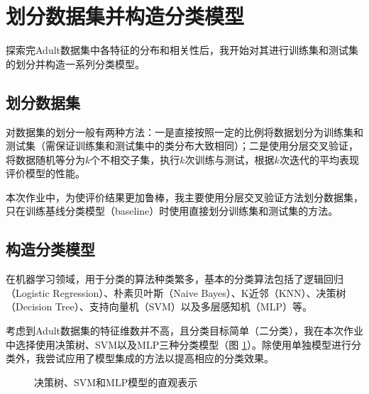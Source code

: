\documentclass[12pt,a4paper]{article}
\theoremstyle{definition}
\begin{document}
\section{划分数据集并构造分类模型}

探索完Adult数据集中各特征的分布和相关性后，我开始对其进行训练集和测试集的划分并构造一系列分类模型。

\subsection{划分数据集}

对数据集的划分一般有两种方法：一是直接按照一定的比例将数据划分为训练集和测试集（需保证训练集和测试集中的类分布大致相同）；二是使用分层交叉验证，将数据随机等分为$k$个不相交子集，执行$k$次训练与测试，根据$k$次迭代的平均表现评价模型的性能。

\vspace{0.01\linewidth}
本次作业中，为使评价结果更加鲁棒，我主要使用分层交叉验证方法划分数据集，只在训练基线分类模型（baseline）时使用直接划分训练集和测试集的方法。

\subsection{构造分类模型}

在机器学习领域，用于分类的算法种类繁多，基本的分类算法包括了逻辑回归（Logistic Regression）、朴素贝叶斯（Naive Bayes）、K近邻（KNN）、决策树（Decision Tree）、支持向量机（SVM）以及多层感知机（MLP）等。

\vspace{0.01\linewidth}
考虑到Adult数据集的特征维数并不高，且分类目标简单（二分类），我在本次作业中选择使用决策树、SVM以及MLP三种分类模型（图 \ref{fig:model-init}）。除使用单独模型进行分类外，我尝试应用了模型集成的方法以提高相应的分类效果。

\begin{figure}[H]
	\centering
	\caption{决策树、SVM和MLP模型的直观表示}
	\label{fig:model-init}
\end{figure}
\end{document}
